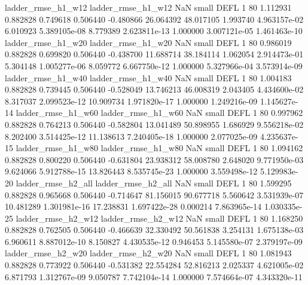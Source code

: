       ladder_rmse_h1_w12       ladder_rmse_h1_w12                   NaN      small     DEFL                 1 80 1.112931       0.882828 0.749618       0.506440   -0.480866     26.064392     48.017105     1.993740   4.963157e-02  6.010923 5.389105e-08     8.779389   2.623811e-13            1.000000    3.007121e-05        1.461463e-10
      ladder_rmse_h1_w20       ladder_rmse_h1_w20                   NaN      small     DEFL                 1 80 0.986019       0.882828 0.699820       0.506440   -0.438700     11.688714     38.184114     1.062054   2.914473e-01  5.304148 1.005277e-06     8.059772   6.667750e-12            1.000000    5.327966e-04        3.573914e-09
      ladder_rmse_h1_w40       ladder_rmse_h1_w40                   NaN      small     DEFL                 1 80 1.004183       0.882828 0.739445       0.506440   -0.528049     13.746213     46.008319     2.043405   4.434600e-02  8.317037 2.099523e-12    10.909734   1.971820e-17            1.000000    1.249216e-09        1.145627e-14
      ladder_rmse_h1_w60       ladder_rmse_h1_w60                   NaN      small     DEFL                 1 80 0.997962       0.882828 0.764213       0.506440   -0.582804     13.041489     50.898955     1.686929   9.556218e-02  8.202400 3.514425e-12    11.138613   7.240405e-18            1.000000    2.077025e-09        4.235637e-15
      ladder_rmse_h1_w80       ladder_rmse_h1_w80                   NaN      small     DEFL                 1 80 1.094162       0.882828 0.800220       0.506440   -0.631804     23.938312     58.008780     2.648020   9.771950e-03  9.624066 5.912788e-15    13.826443   8.535745e-23            1.000000    3.559498e-12        5.129983e-20
      ladder_rmse_h2_all       ladder_rmse_h2_all                   NaN      small     DEFL                 1 80 1.599295       0.882828 0.965668       0.506440   -0.714647     81.156015     90.677718     5.560642   3.531939e-07 10.481289 1.301981e-16    17.238831   1.697422e-28            0.000214    7.863965e-14        1.030335e-25
      ladder_rmse_h2_w12       ladder_rmse_h2_w12                   NaN      small     DEFL                 1 80 1.168250       0.882828 0.762505       0.506440   -0.466639     32.330492     50.561838     3.254131   1.675138e-03  6.960611 8.887012e-10     8.150827   4.430535e-12            0.946453    5.145580e-07        2.379197e-09
      ladder_rmse_h2_w20       ladder_rmse_h2_w20                   NaN      small     DEFL                 1 80 1.081943       0.882828 0.773922       0.506440   -0.531382     22.554284     52.816213     2.025337   4.621005e-02  6.871793 1.312767e-09     9.050787   7.742104e-14            1.000000    7.574664e-07        4.343320e-11
